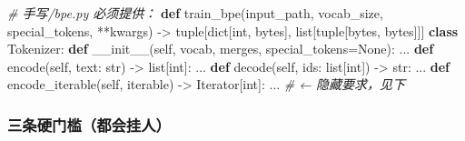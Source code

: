 \documentclass[
  chinese,
  11pt,
]{ctexart}
\newenvironment{Shaded}{}{}
\newcommand{\BuiltInTok}[1]{\textcolor[rgb]{0.00,0.50,0.00}{#1}}
\newcommand{\CommentTok}[1]{\textcolor[rgb]{0.38,0.63,0.69}{\textit{#1}}}
\newcommand{\FunctionTok}[1]{\textcolor[rgb]{0.02,0.16,0.49}{#1}}
\newcommand{\KeywordTok}[1]{\textcolor[rgb]{0.00,0.44,0.13}{\textbf{#1}}}
\newcommand{\NormalTok}[1]{#1}
\newcommand{\OperatorTok}[1]{\textcolor[rgb]{0.40,0.40,0.40}{#1}}
\newcommand{\VariableTok}[1]{\textcolor[rgb]{0.10,0.09,0.49}{#1}}
\begin{document}
\begin{Shaded}
\begin{Highlighting}[]
\CommentTok{\# 手写/bpe.py 必须提供：}
\KeywordTok{def}\NormalTok{ train\_bpe(input\_path, vocab\_size, special\_tokens, }\OperatorTok{**}\NormalTok{kwargs) }\OperatorTok{{-}\textgreater{}} \BuiltInTok{tuple}\NormalTok{[}\BuiltInTok{dict}\NormalTok{[}\BuiltInTok{int}\NormalTok{, }\BuiltInTok{bytes}\NormalTok{], }\BuiltInTok{list}\NormalTok{[}\BuiltInTok{tuple}\NormalTok{[}\BuiltInTok{bytes}\NormalTok{, }\BuiltInTok{bytes}\NormalTok{]]]}
\KeywordTok{class}\NormalTok{ Tokenizer:}
    \KeywordTok{def} \FunctionTok{\_\_init\_\_}\NormalTok{(}\VariableTok{self}\NormalTok{, vocab, merges, special\_tokens}\OperatorTok{=}\VariableTok{None}\NormalTok{): ...}
    \KeywordTok{def}\NormalTok{ encode(}\VariableTok{self}\NormalTok{, text: }\BuiltInTok{str}\NormalTok{) }\OperatorTok{{-}\textgreater{}} \BuiltInTok{list}\NormalTok{[}\BuiltInTok{int}\NormalTok{]: ...}
    \KeywordTok{def}\NormalTok{ decode(}\VariableTok{self}\NormalTok{, ids: }\BuiltInTok{list}\NormalTok{[}\BuiltInTok{int}\NormalTok{]) }\OperatorTok{{-}\textgreater{}} \BuiltInTok{str}\NormalTok{: ...}
    \KeywordTok{def}\NormalTok{ encode\_iterable(}\VariableTok{self}\NormalTok{, iterable) }\OperatorTok{{-}\textgreater{}}\NormalTok{ Iterator[}\BuiltInTok{int}\NormalTok{]: ...   }\CommentTok{\# ← 隐藏要求，见下}
\end{Highlighting}
\end{Shaded}

\subsubsection{三条硬门槛（都会挂人）}\label{ux4e09ux6761ux786cux95e8ux69dbux90fdux4f1aux6302ux4eba}
\end{document}
